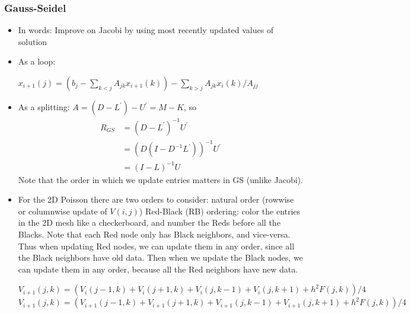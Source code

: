 \documentclass[11pt]{article}
\numberwithin{equation}{section}
\begin{document}
\subsubsection{Gauss-Seidel}
\begin{itemize}
    \item In words: Improve on Jacobi by using most recently updated values of solution
    \item As a loop:
    \begin{algorithmfrm}
        \begin{algorithmic}[1]
            \State $x_{i+1}(j)=\left( b_j - \sum_{k < j} A_{jk}x_{i+1}(k) \right) - \sum_{k > j} A_{jk}x_i(k) / A_{jj}$ 
            \EndFor
        \end{algorithmic}
    \end{algorithmfrm}
    \item As a splitting: $A = (D - L^\prime) - U^\prime = M - K$, so 
    \begin{align*}
        R_{GS} &= (D-L^\prime)^{-1}U^\prime \\
        &= (D(I-D^{-1}L^\prime))^{-1}U^\prime \\
        &= (I - L)^{-1} U
    \end{align*}
    Note that the order in which we update entries matters in GS (unlike Jacobi).
    \item For the 2D Poisson there are two orders to consider: natural order (rowwise or columnwise update of $V(i,j)$)
    Red-Black (RB) ordering: color the entries in the 2D mesh like a checkerboard, and number the Reds before all the Blacks. 
    Note that each Red node only has Black neighbors, and vice-versa. Thus when updating Red nodes, 
    we can update them in any order, since all the Black neighbors have old data. Then when we update the Black nodes, 
    we can update them in any order, because all the Red neighbors have new data.
    \begin{algorithmfrm}
        \begin{algorithmic}[1]
            \State $V_{i+1}(j,k) = (V_i(j-1,k) + V_i(j+1,k) + V_i(j,k-1) + V_i(j,k+1) + h^2 F(j,k))/4$ 
            \EndFor
            \State $V_{i+1}(j,k) = (V_{i+1}(j-1,k) + V_{i+1}(j+1,k) + V_{i+1}(j,k-1) + V_{i+1}(j,k+1) + h^2 F(j,k))/4$ 
            \EndFor
        \end{algorithmic}
    \end{algorithmfrm}
\end{itemize}
\end{document}

